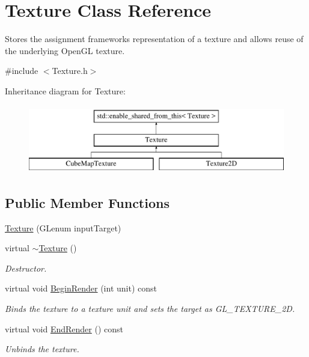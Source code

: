 \hypertarget{class_texture}{}\section{Texture Class Reference}
\label{class_texture}


Stores the assignment framework\textquotesingle{}s representation of a texture and allows reuse of the underlying Open\+GL texture.  




{\ttfamily \#include $<$Texture.\+h$>$}

Inheritance diagram for Texture\+:\begin{figure}[H]
\begin{center}
\leavevmode
\includegraphics[height=3.000000cm]{class_texture}
\end{center}
\end{figure}
\subsection*{Public Member Functions}
\begin{DoxyCompactItemize}
\item 
\hyperlink{class_texture_aa9661e01f3c034c259c15b619e2cea55}{Texture} (G\+Lenum input\+Target)
\item 
virtual \hyperlink{class_texture_a09c4bcb7462f64c1d20fa69dba3cee8a}{$\sim$\+Texture} ()
\begin{DoxyCompactList}\small\item\em Destructor. \end{DoxyCompactList}\item 
virtual void \hyperlink{class_texture_a6c9fda62e4203d0545ec0d3d0551760d}{Begin\+Render} (int unit) const
\begin{DoxyCompactList}\small\item\em Binds the texture to a texture unit and sets the target as G\+L\+\_\+\+T\+E\+X\+T\+U\+R\+E\+\_\+2D. \end{DoxyCompactList}\item 
virtual void \hyperlink{class_texture_ab3fc771da58d58e1f3701b1fae12880b}{End\+Render} () const
\begin{DoxyCompactList}\small\item\em Unbinds the texture. \end{DoxyCompactList}\end{DoxyCompactItemize}
